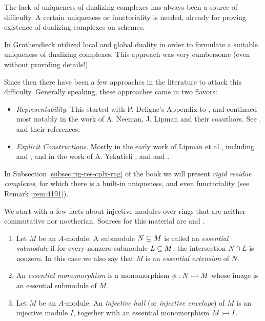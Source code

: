 \begin{rem} \label{rem:2196}
The lack of uniqueness of dualizing complexes has always been a source of 
difficulty. A certain uniqueness or functoriality is needed, already for 
proving existence of dualizing complexes on schemes. 

In \cite{RD} Grothendieck utilized local and global duality in 
order to formulate a suitable uniqueness of dualizing 
complexes. This approach was very cumbersome (even without providing details!).

Since then there have been a few approaches in the literature to attack this 
difficulty. Generally speaking, these approaches came in two flavors:
\begin{itemize}
\item {\em Representability}. This started with P. Deligne's Appendix to 
\cite{RD}, and continued most notably in the work of A. Neeman, J. Lipman and 
their coauthors. See \cite{Ne2}, \cite{Li2} and their references. 

\item {\em Explicit Constructions}. Mostly in the early work of Lipman et 
al., including \cite{Li1} and \cite{LNS}, and in the work of A. Yekutieli 
\cite{Ye2}, and \cite{Ye3} and \cite{Ye5}. 
\end{itemize}

In Subsection \ref{subsec:rig-res-cplx-rng} of the book we will present {\em 
rigid residue complexes}, for which there is a built-in uniqueness, and even 
functoriality (see Remark \ref{rem:4191}). 
\end{rem}

\newpage



\label{subsec:mr-inj-res}

We start with a few facts about injective modules over rings that are neither 
commutative nor noetherian. Sources for this material are \cite{Rot} and
\cite{Lam}. 

\begin{dfn} \label{dfn:2205} \mbox{}
\begin{enumerate}
\item Let $M$ be an $A$-module. A submodule $N \subseteq M$ is called an 
{\em essential submodule} 
if for every nonzero submodule $L \subseteq M$, the 
intersection $N \cap L$ is nonzero. In this case we also say that $M$ is an 
{\em essential extension} of $N$. 

\item An {\em essential monomorphism}
is a monomorphism $\phi : N \rightarrowtail M$
whose image is an essential submodule of $M$.   

\item Let $M$ be an $A$-module. An {\em injective hull}
(or {\em injective 
envelope}) of $M$ is an injective module $I$, together with an essential 
monomorphism $M \rightarrowtail I$. 
\end{enumerate}
\end{dfn}

